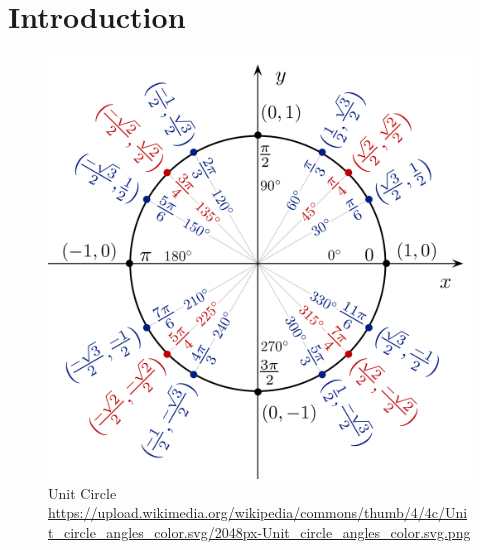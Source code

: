 \chapter{Introduction}
\newpage

\lipsum

\begin{figure}[ht]
	\begin{center}
		\includegraphics[width=0.6\linewidth]{Figures/Unit_circle.png}
		\captionsetup{justification=centering}
		\caption[Unit Circle]{Unit Circle \\ \url{https://upload.wikimedia.org/wikipedia/commons/thumb/4/4c/Unit_circle\_angles_color.svg/2048px-Unit_circle_angles_color.svg.png}}
		\label{fig:cover}
	\end{center}
\end{figure}